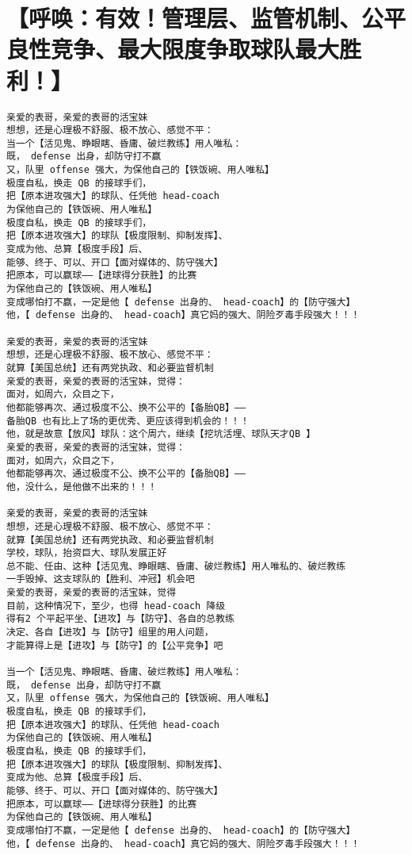 \documentclass[9pt, b5paper]{article}
\begin{document}
\section{【呼唤：有效！管理层、监管机制、公平良性竞争、最大限度争取球队最大胜利！】}
\label{sec-2}
\begin{verbatim}
亲爱的表哥，亲爱的表哥的活宝妹
想想，还是心理极不舒服、极不放心、感觉不平：
当一个【活见鬼、睁眼瞎、昏庸、破烂教练】用人唯私：
既， defense 出身，却防守打不赢
又，队里 offense 强大，为保他自己的【铁饭碗、用人唯私】
极度自私，换走 QB 的接球手们，
把【原本进攻强大】的球队、任凭他 head-coach
为保他自己的【铁饭碗、用人唯私】
极度自私，换走 QB 的接球手们，
把【原本进攻强大】的球队【极度限制、抑制发挥】、
变成为他、总算【极度手段】后、
能够、终于、可以、开口【面对媒体的、防守强大】
把原本，可以赢球——【进球得分获胜】的比赛
为保他自己的【铁饭碗、用人唯私】
变成哪怕打不赢，一定是他【 defense 出身的、 head-coach】的【防守强大】
他，【 defense 出身的、 head-coach】真它妈的强大、阴险歹毒手段强大！！！

亲爱的表哥，亲爱的表哥的活宝妹
想想，还是心理极不舒服、极不放心、感觉不平：
就算【美国总统】还有两党执政、和必要监督机制
亲爱的表哥，亲爱的表哥的活宝妹，觉得：
面对，如周六，众目之下，
他都能够再次、通过极度不公、换不公平的【备胎QB】——
备胎QB 也有比上了场的更优秀、更应该得到机会的！！！
他，就是故意【放风】球队：这个周六，继续【挖坑活埋、球队天才QB 】
亲爱的表哥，亲爱的表哥的活宝妹，觉得：
面对，如周六，众目之下，
他都能够再次、通过极度不公、换不公平的【备胎QB】——
他，没什么，是他做不出来的！！！

亲爱的表哥，亲爱的表哥的活宝妹
想想，还是心理极不舒服、极不放心、感觉不平：
就算【美国总统】还有两党执政、和必要监督机制
学校，球队，抬资巨大、球队发展正好
总不能、任由、这种【活见鬼、睁眼瞎、昏庸、破烂教练】用人唯私的、破烂教练
一手毁掉、这支球队的【胜利、冲冠】机会吧
亲爱的表哥，亲爱的表哥的活宝妹，觉得
目前，这种情况下，至少，也得 head-coach 降级
得有2 个平起平坐、【进攻】与【防守】、各自的总教练
决定、各自【进攻】与【防守】组里的用人问题，
才能算得上是【进攻】与【防守】的【公平竞争】吧

当一个【活见鬼、睁眼瞎、昏庸、破烂教练】用人唯私：
既， defense 出身，却防守打不赢
又，队里 offense 强大，为保他自己的【铁饭碗、用人唯私】
极度自私，换走 QB 的接球手们，
把【原本进攻强大】的球队、任凭他 head-coach
为保他自己的【铁饭碗、用人唯私】
极度自私，换走 QB 的接球手们，
把【原本进攻强大】的球队【极度限制、抑制发挥】、
变成为他、总算【极度手段】后、
能够、终于、可以、开口【面对媒体的、防守强大】
把原本，可以赢球——【进球得分获胜】的比赛
为保他自己的【铁饭碗、用人唯私】
变成哪怕打不赢，一定是他【 defense 出身的、 head-coach】的【防守强大】
他，【 defense 出身的、 head-coach】真它妈的强大、阴险歹毒手段强大！！！


\end{verbatim}
\end{document}
